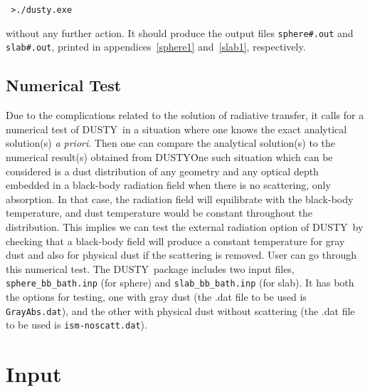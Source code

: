 \documentclass[11pt]{article}
\def\D  {{\sf DUSTY}}
\begin{document}
\bigskip
{\tt 
>./dusty.exe
} 

\bigskip\noindent without any further action. It should produce the 
output files {\tt sphere\#.out} and {\tt slab\#.out}, printed in 
appendices~\ref{sphere1} and~\ref{slab1}, respectively.

\subsection{Numerical Test}

Due to the complications related to the solution of radiative transfer, 
it calls for a numerical test of \D\ in a situation where one knows  
the exact analytical solution(s) {\it a priori}. Then one can compare the 
analytical solution(s) to the numerical result(s) obtained from \D\. One such 
situation which can be considered is a dust distribution of any geometry and 
any optical depth embedded in a black-body radiation field  when there is no 
scattering, only absorption. In that case, the radiation field will equilibrate 
with the black-body temperature, and dust temperature would be constant 
throughout the distribution. This implies we can test the external radiation 
option of \D\ by checking that a black-body field will produce a constant 
temperature for gray dust and also for physical dust if the scattering is 
removed. User can go through this numerical test. The \D\ package includes 
two input files, {\tt sphere\_bb\_bath.inp} (for sphere) and {\tt slab\_bb\_bath.inp} 
(for slab). It has both the options for testing, one with gray dust (the .dat file 
to be used is {\tt GrayAbs.dat}), and the other with physical dust without
scattering (the .dat file to be used is {\tt ism-noscatt.dat}).

\section{Input}
\label{input}
\end{document}

